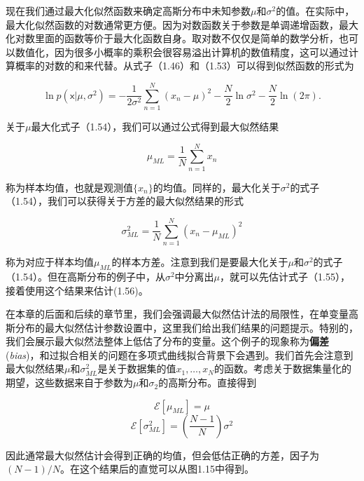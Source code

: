 	现在我们通过最大化似然函数来确定高斯分布中未知参数$\mu$和$\sigma^2$的值。在实际中，最大化似然函数的对数通常更方便。因为对数函数关于参数是单调递增函数，最大化对数里面的函数等价于最大化函数自身。取对数不仅仅是简单的数学分析，也可以数值化，因为很多小概率的乘积会很容易溢出计算机的数值精度，这可以通过计算概率的对数的和来代替。从式子（1.46）和（1.53）可以得到似然函数的形式为
	
	\begin{equation}
	\ln p(\mathsf{x} | \mu, \sigma^2) = -\frac{1}{2 \sigma^2} \sum_{n = 1}^{N} (x_n - \mu)^2 - \frac{N}{2}\ln \sigma^2 - \frac{N}{2} \ln(2 \pi).
	\end{equation}
	
	关于$\mu$最大化式子（1.54），我们可以通过公式得到最大似然结果
	
	\begin{equation}
	\mu_{ML} = \frac{1}{N} \sum_{n = 1}^{N} x_n
	\end{equation}
	
	称为样本均值，也就是观测值$\{ x_n\}$的均值。同样的，最大化关于$\sigma^2$的式子（1.54），我们可以获得关于方差的最大似然结果的形式
	
	\begin{equation}
	\sigma_{ML}^2 = \frac{1}{N} \sum_{n = 1}^{N}(x_n - \mu_{ML})^2
	\end{equation}
	
	称为对应于样本均值$\mu_{ML}$的样本方差。注意到我们是要最大化关于$\mu$和$\sigma^2$的式子（1.54）。但在高斯分布的例子中，从$\sigma^2$中分离出$\mu$，就可以先估计式子（1.55），接着使用这个结果来估计(1.56)。
	
	在本章的后面和后续的章节里，我们会强调最大似然估计法的局限性，在单变量高斯分布的最大似然估计参数设置中，这里我们给出我们结果的问题提示。特别的，我们会展示最大似然法整体上低估了分布的变量。这个例子的现象称为\textbf{偏差}(\textit{bias})，和过拟合相关的问题在多项式曲线拟合背景下会遇到。我们首先会注意到最大似然结果$\mu$和$\sigma_{ML}^2$是关于数据集的值$x_1, \dots, x_N$的函数。考虑关于数据集量化的期望，这些数据来自于参数为$\mu$和$\sigma_2$的高斯分布。直接得到
	
	\begin{equation}
	\mathcal{E}[\mu_{ML}] = \mu
	\end{equation}
	\begin{equation}
	\mathcal{E}[\sigma_{ML}^2] = (\frac{N - 1}{N}) \sigma^2
	\end{equation}
	
	因此通常最大似然估计会得到正确的均值，但会低估正确的方差，因子为$(N - 1)/N$。在这个结果后的直觉可以从图1.15中得到。
	
